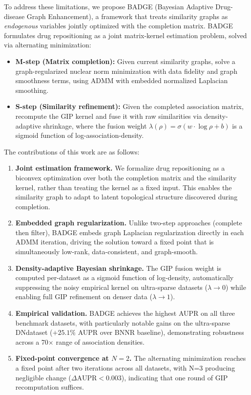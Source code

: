 \documentclass{oup-authoring-template}
\begin{document}
To address these limitations, we propose BADGE (Bayesian Adaptive Drug-disease Graph Enhancement), a framework that treats similarity graphs as \emph{endogenous} variables jointly optimized with the completion matrix. BADGE formulates drug repositioning as a joint matrix-kernel estimation problem, solved via alternating minimization:

\begin{itemize}
    \item \textbf{M-step (Matrix completion):} Given current similarity graphs, solve a graph-regularized nuclear norm minimization with data fidelity and graph smoothness terms, using ADMM with embedded normalized Laplacian smoothing.
    \item \textbf{S-step (Similarity refinement):} Given the completed association matrix, recompute the GIP kernel and fuse it with raw similarities via density-adaptive shrinkage, where the fusion weight $\lambda(\rho) = \sigma(w \cdot \log\rho + b)$ is a sigmoid function of log-association-density.
\end{itemize}

The contributions of this work are as follows:

\begin{enumerate}
    \item \textbf{Joint estimation framework.} We formalize drug repositioning as a biconvex optimization over both the completion matrix and the similarity kernel, rather than treating the kernel as a fixed input. This enables the similarity graph to adapt to latent topological structure discovered during completion.

    \item \textbf{Embedded graph regularization.} Unlike two-step approaches (complete then filter), BADGE embeds graph Laplacian regularization directly in each ADMM iteration, driving the solution toward a fixed point that is simultaneously low-rank, data-consistent, and graph-smooth.

    \item \textbf{Density-adaptive Bayesian shrinkage.} The GIP fusion weight is computed per-dataset as a sigmoid function of log-density, automatically suppressing the noisy empirical kernel on ultra-sparse datasets ($\lambda \to 0$) while enabling full GIP refinement on denser data ($\lambda \to 1$).

    \item \textbf{Empirical validation.} BADGE achieves the highest AUPR on all three benchmark datasets, with particularly notable gains on the ultra-sparse DNdataset ($+25.1\%$ AUPR over BNNR baseline), demonstrating robustness across a 70$\times$ range of association densities.

    \item \textbf{Fixed-point convergence at $N=2$.} The alternating minimization reaches a fixed point after two iterations across all datasets, with N=3 producing negligible change ($\Delta \text{AUPR} < 0.003$), indicating that one round of GIP recomputation suffices.
\end{enumerate}
\end{document}
